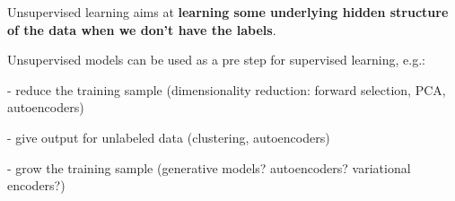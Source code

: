 Unsupervised learning aims at \textbf{learning some underlying hidden structure of the data when we don't have the labels}.

Unsupervised models can be used as a pre step for supervised learning, e.g.:

- reduce the training sample (dimensionality reduction: forward selection, PCA, autoencoders)

- give output for unlabeled data (clustering, autoencoders)

- grow the training sample (generative models? autoencoders? variational encoders?)

\vspace{5mm}